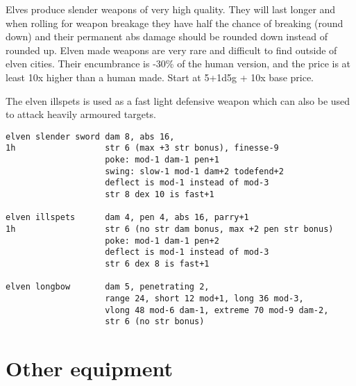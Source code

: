 Elves produce slender weapons of very high quality. They will last longer and when rolling for weapon breakage they have half the chance of breaking (round down) and their permanent abs damage should be rounded down instead of rounded up. Elven made weapons are very rare and difficult to find outside of elven cities. Their encumbrance is -30\% of the human version, and the price is at least 10x higher than a human made. Start at 5+1d5g + 10x base price.

The elven illspets is used as a fast light defensive weapon which can also be used to attack heavily armoured targets.
\small \begin{verbatim}
elven slender sword dam 8, abs 16,
1h                  str 6 (max +3 str bonus), finesse-9
                    poke: mod-1 dam-1 pen+1
                    swing: slow-1 mod-1 dam+2 todefend+2
                    deflect is mod-1 instead of mod-3
                    str 8 dex 10 is fast+1

elven illspets      dam 4, pen 4, abs 16, parry+1
1h                  str 6 (no str dam bonus, max +2 pen str bonus)
                    poke: mod-1 dam-1 pen+2
                    deflect is mod-1 instead of mod-3
                    str 6 dex 8 is fast+1

elven longbow       dam 5, penetrating 2,
                    range 24, short 12 mod+1, long 36 mod-3,
                    vlong 48 mod-6 dam-1, extreme 70 mod-9 dam-2,
                    str 6 (no str bonus)
\end{verbatim} \normalsize










\section*{Other equipment}


